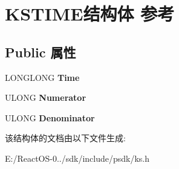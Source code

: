 \hypertarget{struct_k_s_t_i_m_e}{}\section{K\+S\+T\+I\+M\+E结构体 参考}
\label{struct_k_s_t_i_m_e}
\subsection*{Public 属性}
\begin{DoxyCompactItemize}
\item 
\mbox{\label{struct_k_s_t_i_m_e_a93eaad26488e9e8ab3e5093f9caac839}} 
L\+O\+N\+G\+L\+O\+NG {\bfseries Time}
\item 
\mbox{\label{struct_k_s_t_i_m_e_acaf2a40ad30a361fffebb509e7f564de}} 
U\+L\+O\+NG {\bfseries Numerator}
\item 
\mbox{\label{struct_k_s_t_i_m_e_aaf71d550df25184de8fb4c07e0a70f95}} 
U\+L\+O\+NG {\bfseries Denominator}
\end{DoxyCompactItemize}


该结构体的文档由以下文件生成\+:\begin{DoxyCompactItemize}
\item 
E\+:/\+React\+O\+S-\/0../sdk/include/psdk/ks.\+h\end{DoxyCompactItemize}
